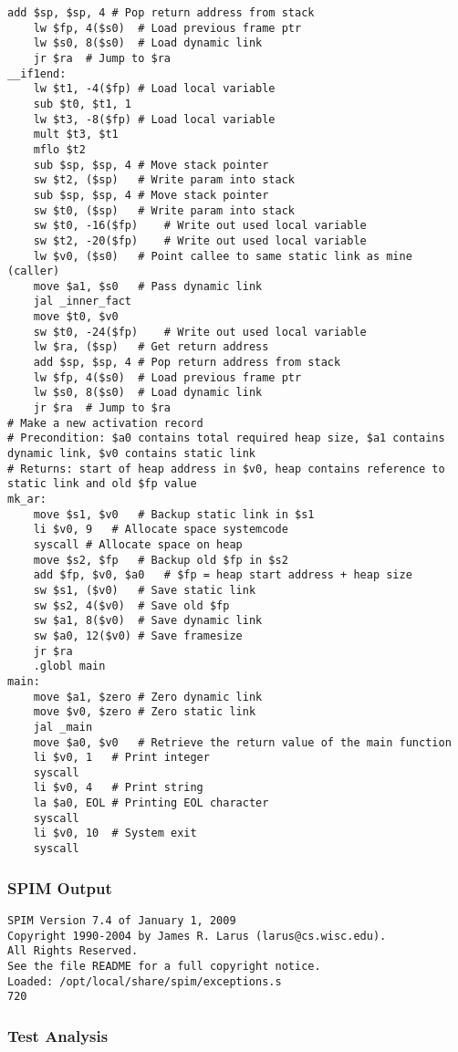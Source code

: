 \begin{lstlisting}[showstringspaces=false,breaklines=true,backgroundcolor=\color{light-gray}, captionpos=b]
	add $sp, $sp, 4	# Pop return address from stack
	lw $fp, 4($s0)	# Load previous frame ptr
	lw $s0, 8($s0)	# Load dynamic link
	jr $ra	# Jump to $ra
__if1end:
	lw $t1, -4($fp)	# Load local variable
	sub $t0, $t1, 1
	lw $t3, -8($fp)	# Load local variable
	mult $t3, $t1
	mflo $t2
	sub $sp, $sp, 4	# Move stack pointer
	sw $t2, ($sp)	# Write param into stack
	sub $sp, $sp, 4	# Move stack pointer
	sw $t0, ($sp)	# Write param into stack
	sw $t0, -16($fp)	# Write out used local variable
	sw $t2, -20($fp)	# Write out used local variable
	lw $v0, ($s0)	# Point callee to same static link as mine (caller)
	move $a1, $s0	# Pass dynamic link
	jal _inner_fact
	move $t0, $v0
	sw $t0, -24($fp)	# Write out used local variable
	lw $ra, ($sp)	# Get return address
	add $sp, $sp, 4	# Pop return address from stack
	lw $fp, 4($s0)	# Load previous frame ptr
	lw $s0, 8($s0)	# Load dynamic link
	jr $ra	# Jump to $ra
# Make a new activation record
# Precondition: $a0 contains total required heap size, $a1 contains dynamic link, $v0 contains static link
# Returns: start of heap address in $v0, heap contains reference to static link and old $fp value
mk_ar:
	move $s1, $v0	# Backup static link in $s1
	li $v0, 9	# Allocate space systemcode
	syscall	# Allocate space on heap
	move $s2, $fp	# Backup old $fp in $s2
	add $fp, $v0, $a0	# $fp = heap start address + heap size
	sw $s1, ($v0)	# Save static link
	sw $s2, 4($v0)	# Save old $fp
	sw $a1, 8($v0)	# Save dynamic link
	sw $a0, 12($v0)	# Save framesize
	jr $ra
	.globl main
main:
	move $a1, $zero	# Zero dynamic link
	move $v0, $zero	# Zero static link
	jal _main
	move $a0, $v0	# Retrieve the return value of the main function
	li $v0, 1	# Print integer
	syscall
	li $v0, 4	# Print string
	la $a0, EOL	# Printing EOL character
	syscall
	li $v0, 10	# System exit
	syscall

\end{lstlisting}\subsubsection{SPIM Output}
\begin{verbatim}
SPIM Version 7.4 of January 1, 2009
Copyright 1990-2004 by James R. Larus (larus@cs.wisc.edu).
All Rights Reserved.
See the file README for a full copyright notice.
Loaded: /opt/local/share/spim/exceptions.s
720
\end{verbatim}\subsubsection{Test Analysis}

